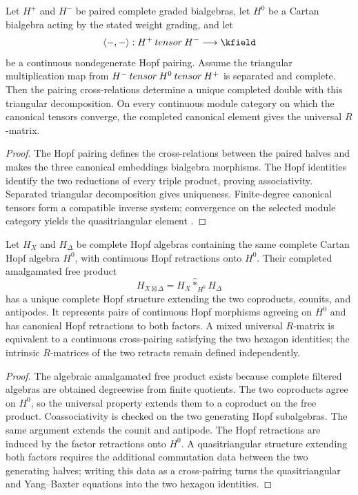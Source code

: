 \begin{theorem}
Let $H^+$ and $H^-$ be paired complete graded bialgebras, let $H^0$ be a Cartan bialgebra acting by the stated weight grading, and let
\[
 \angles{-,-}:H^+\widehattensor H^-\longrightarrow\kfield
\]
be a continuous nondegenerate Hopf pairing. Assume the triangular multiplication map from $H^-\mathbin{tensor} H^0\mathbin{tensor} H^+$ is separated and complete. Then the pairing cross-relations determine a unique completed double with this triangular decomposition. On every continuous module category on which the canonical tensors converge, the completed canonical element gives the universal $R$-matrix.
\end{theorem}
\begin{proof}
The Hopf pairing defines the cross-relations between the paired halves and makes the three canonical embeddings bialgebra morphisms. The Hopf identities identify the two reductions of every triple product, proving associativity. Separated triangular decomposition gives uniqueness. Finite-degree canonical tensors form a compatible inverse system; convergence on the selected module category yields the quasitriangular element \cite{DrinfeldDouble,EtingofSchiffmann}.
\end{proof}

\begin{theorem}
Let $H_X$ and $H_\Delta$ be complete Hopf algebras containing the same complete Cartan Hopf algebra $H^0$, with continuous Hopf retractions onto $H^0$.  Their completed amalgamated free product
\[
 H_{X\boxtimes\Delta}
 =H_X\widehat *_{H^0}H_\Delta
\]
has a unique complete Hopf structure extending the two coproducts, counits, and antipodes.  It represents pairs of continuous Hopf morphisms agreeing on $H^0$ and has canonical Hopf retractions to both factors.  A mixed universal $R$-matrix is equivalent to a continuous cross-pairing satisfying the two hexagon identities; the intrinsic $R$-matrices of the two retracts remain defined independently.
\end{theorem}
\begin{proof}
The algebraic amalgamated free product exists because complete filtered algebras are obtained degreewise from finite quotients.  The two coproducts agree on $H^0$, so the universal property extends them to a coproduct on the free product.  Coassociativity is checked on the two generating Hopf subalgebras.  The same argument extends the counit and antipode.  The Hopf retractions are induced by the factor retractions onto $H^0$.  A quasitriangular structure extending both factors requires the additional commutation data between the two generating halves; writing this data as a cross-pairing turns the quasitriangular and Yang--Baxter equations into the two hexagon identities.
\end{proof}


